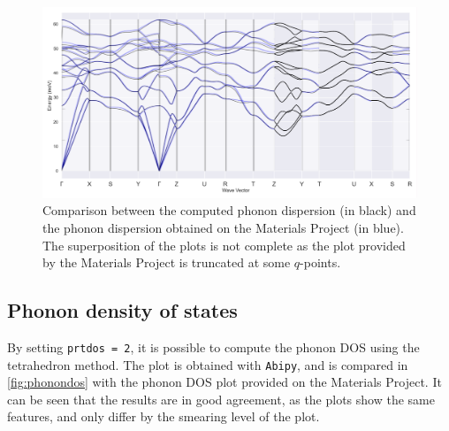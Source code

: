 \documentclass[11pt,a4paper]{article}
\begin{document}
\begin{figure}
\centering
\includegraphics[width=\textwidth]{images/phonon2.pdf}
\caption{Comparison between the computed phonon dispersion (in black) and the phonon dispersion obtained on the Materials Project (in blue). The superposition of the plots is not complete as the plot provided by the Materials Project is truncated at some $q$-points.}
\label{fig:phonon2}
\end{figure}

\subsection{Phonon density of states}
By setting \texttt{prtdos = 2}, it is possible to compute the phonon DOS using the tetrahedron method. The plot is obtained with \texttt{Abipy}, and is compared in \autoref{fig:phonondos} with the phonon DOS plot provided on the Materials Project. It can be seen that the results are in good agreement, as the plots show the same features, and only differ by the smearing level of the plot.
\end{document}
